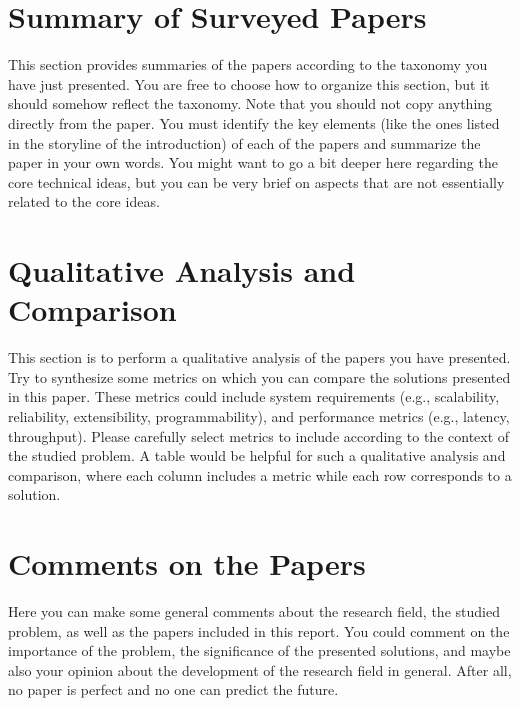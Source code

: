 \documentclass{upb-cn}
\begin{document}
\section{Summary of Surveyed Papers}
\label{sec:papers}

This section provides summaries of the papers according to the taxonomy you have just presented. You are free to choose how to organize this section, but it should somehow reflect the taxonomy. Note that you should not copy anything directly from the paper. You must identify the key elements (like the ones listed in the storyline of the introduction) of each of the papers and summarize the paper in your own words. You might want to go a bit deeper here regarding the core technical ideas, but you can be very brief on aspects that are not essentially related to the core ideas.

\section{Qualitative Analysis and Comparison}
\label{sec:analysis}

This section is to perform a qualitative analysis of the papers you have presented. Try to synthesize some metrics on which you can compare the solutions presented in this paper. These metrics could include system requirements (e.g., scalability, reliability, extensibility, programmability), and performance metrics (e.g., latency, throughput). Please carefully select metrics to include according to the context of the studied problem. A table would be helpful for such a qualitative analysis and comparison, where each column includes a metric while each row corresponds to a solution.

\section{Comments on the Papers}
\label{sec:comments}

Here you can make some general comments about the research field, the studied problem, as well as the papers included in this report. You could comment on the importance of the problem, the significance of the presented solutions, and maybe also your opinion about the development of the research field in general. After all, no paper is perfect and no one can predict the future. 
\end{document}
